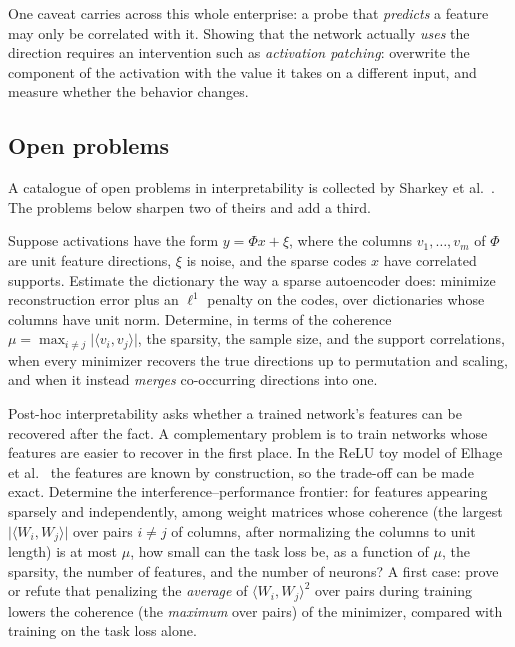 One caveat carries across this whole enterprise: a probe that \emph{predicts} a feature may only be correlated with it. Showing that the network actually \emph{uses} the direction requires an intervention such as \emph{activation patching}: overwrite the component of the activation with the value it takes on a different input, and measure whether the behavior changes. 

\subsection{Open problems}

A catalogue of open problems in interpretability is collected by Sharkey et al.~\cite{sharkey2025}. The problems below sharpen two of theirs and add a third.

\begin{openproblem}
Suppose activations have the form $y=\Phi x+\xi$, where the columns $v_1,\dots,v_m$ of $\Phi$ are unit feature directions, $\xi$ is noise, and the sparse codes $x$ have correlated supports. Estimate the dictionary the way a sparse autoencoder does: minimize reconstruction error plus an $\ell^1$ penalty on the codes, over dictionaries whose columns have unit norm. Determine, in terms of the coherence $\mu=\max_{i\neq j}\lvert\langle v_i,v_j\rangle\rvert$, the sparsity, the sample size, and the support correlations, when every minimizer recovers the true directions up to permutation and scaling, and when it instead \emph{merges} co-occurring directions into one.
\end{openproblem}

\begin{openproblem}
Post-hoc interpretability asks whether a trained network's features can be recovered after the fact. A complementary problem is to train networks whose features are easier to recover in the first place. In the ReLU toy model of Elhage et al.~\cite{elhage2022} the features are known by construction, so the trade-off can be made exact. Determine the interference--performance frontier: for features appearing sparsely and independently, among weight matrices whose coherence (the largest $\lvert\langle W_i,W_j\rangle\rvert$ over pairs $i\neq j$ of columns, after normalizing the columns to unit length) is at most $\mu$, how small can the task loss be, as a function of $\mu$, the sparsity, the number of features, and the number of neurons? A first case: prove or refute that penalizing the \emph{average} of $\langle W_i,W_j\rangle^2$ over pairs during training lowers the coherence (the \emph{maximum} over pairs) of the minimizer, compared with training on the task loss alone.
\end{openproblem}

